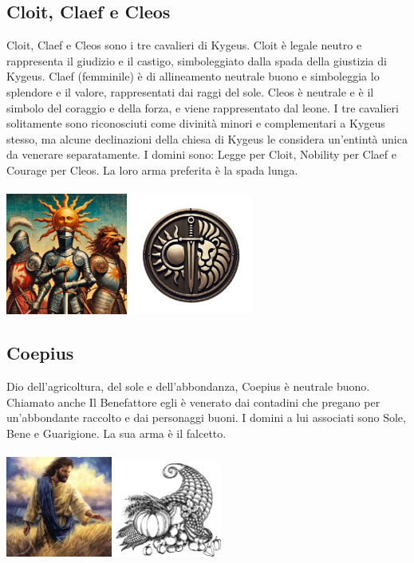 \documentclass[10pt, a4paper]{report}
\begin{document}
\begin{multicols}{2}
\subsection*{Cloit, Claef e Cleos}
Cloit, Claef e Cleos sono i tre cavalieri di Kygeus. Cloit è legale neutro e rappresenta il giudizio e il castigo, simboleggiato dalla spada della giustizia di Kygeus. Claef (femminile) è di allineamento neutrale buono e simboleggia lo splendore e il valore, rappresentati dai raggi del sole. Cleos è neutrale e è il simbolo del coraggio e della forza, e viene rappresentato dal leone. I tre cavalieri solitamente sono riconosciuti come divinità minori e complementari a Kygeus stesso, ma alcune declinazioni della chiesa di Kygeus le considera un'entintà unica da venerare separatamente. I domini sono: Legge per Cloit, Nobility per Claef e Courage per Cleos. La loro arma preferita è la spada lunga.\\
\\
\includegraphics[width=4cm]{ccc.jpeg}
\includegraphics[width=4cm]{ccc_simbolo.png}
\subsection*{Coepius}
Dio dell'agricoltura, del sole e dell'abbondanza, Coepius è neutrale buono. Chiamato anche Il Benefattore egli è venerato dai contadini che pregano per un'abbondante raccolto e dai personaggi buoni. I domini a lui associati sono Sole, Bene e Guarigione. La sua arma è il falcetto.\\
\\
\includegraphics[width=3.5cm]{coepius.jpg}
\includegraphics[width=3.5cm]{coepius_simbolo.png}

\end{multicols}
\end{document}
